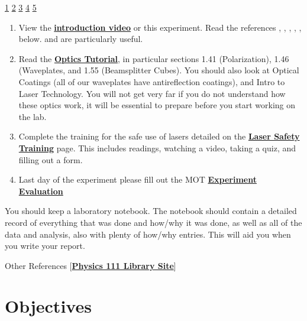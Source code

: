 \documentclass{../lab}
\begin{document}
\signatures \hyperlink{Violet Beam Path}{1} \hyperlink{Angle}{2} \hyperlink{Infrared Beam Path}{3} \hyperlink{Arbitrary Offset}{4} \hyperlink{$C_1$, $C_2$, and $\phi$}{5} 

\begin{enumerate}
    \item View the\textbf{ }\href{http://experimentationlab.berkeley.edu/sites/default/files/QIE/qie\_introduction\_final2.mp4}{\textbf{introduction video}} or this experiment. Read the references \cite{Dehlinger}, \cite{Bell}, \cite{Clauser}, \cite{Walborn}, \cite{Lukishova}, \cite{Fox} below. \cite{Dehlinger} and \cite{Lukishova} are particularly useful.

    \item Read the \href{http://experimentationlab.berkeley.edu/sites/default/files/QIE/fundamental-Optics.pdf}{\textbf{Optics Tutorial}}, in particular sections 1.41 (Polarization), 1.46 (Waveplates, and 1.55 (Beamsplitter Cubes). You should also look at Optical Coatings (all of our waveplates have antireflection coatings), and Intro to Laser Technology. You will not get very far if you do not understand how these optics work, it will be essential to prepare before you start working on the lab.

    \item Complete the training for the safe use of lasers detailed on the \href{http://experimentationlab.berkeley.edu/lasersafety}{\textbf{\textbf{Laser Safety Training}}} page. This includes readings, watching a video, taking a quiz, and filling out a form.

    \item Last day of the experiment please fill out the MOT  \href{\ExperimentEvaluation}{\textbf{Experiment Evaluation}}

\end{enumerate}

You should keep a laboratory notebook. The notebook should contain a detailed record of everything that was done and how/why it was done, as well as all of the data and analysis, also with plenty of how/why entries. This will aid you when you write your report.

Other References [\href{http://physics111.lib.berkeley.edu/Physics111/Reprints/QIE/QIE\_index.html}{\textbf{Physics 111 Library Site}}]

\section{Objectives}
\end{document}
